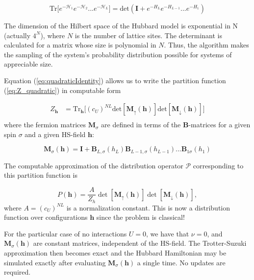 \documentclass[10pt, twocolumn, twoside]{article}
\begin{document}
\begin{equation}\label{eq:quadraticIdentity}
\text{Tr} \big[ e^{-\mathcal{H}_1 } e^{-\mathcal{H}_2 } ... e^{-\mathcal{H}_L } \big] = \text{det} ( \bm I + e^{-H_L} e^{-H_{L-1}} ... e^{-H_1} )
\end{equation}

The dimension of the Hilbert space of the Hubbard model is exponential in N (actually $4^N$), where $N$ is the number of lattice sites. The determinant is calculated for a matrix whose size is polynomial in $N$. Thus, the algorithm makes the sampling of the system's probability distribution possible for systems of appreciable size.

Equation (\ref{eq:quadraticIdentity}) allows us to write the partition function (\ref{eq:Z_quadratic}) in computable form

\begin{equation}
\begin{split}
Z_{\bm h} &=  \text{Tr}_{\bm h} \bigg[ (c_U)^{NL} \text{det} [ \bm M_\uparrow (\bm h)] \text{det} [  \bm M_\downarrow (\bm h) ] \bigg] \\
\end{split}
\end{equation}
where the fermion matrices $\bm M_\sigma$ are defined in terms of the $\bm B$-matrices for a given spin $\sigma$ and a given HS-field $\bm h$:

\begin{equation}
\bm M_\sigma (\bm h) = \bm I + \bm B_{L,\sigma} ( h_L) \bm B_{L-1,\sigma} ( h_{L-1}) ... \bm B_{1\sigma} ( h_1)
\end{equation}

The computable approximation of the distribution operator $\mathcal{P}$ corresponding to this partition function is

\begin{equation}\label{eq:prob}
P(\bm h) = \frac{A}{Z_h} \det [ \bm M_{\uparrow}(\bm h) ] \det [ \bm M_{\downarrow}(\bm h) ] ,
\end{equation}
where $A = (c_U)^{NL}$ is a normalization constant. This is now a distribution function over configurations $\bm h$ since the problem is classical!

For the particular case of no interactions $U = 0$, we have that $\nu = 0$, and $\bm M_\sigma (\bm h)$ are constant matrices, independent of the HS-field. The Trotter-Suzuki approximation then becomes exact and the Hubbard Hamiltonian may be simulated exactly after evaluating $\bm M_\sigma (\bm h)$ a single time. No updates are required.
\end{document}
